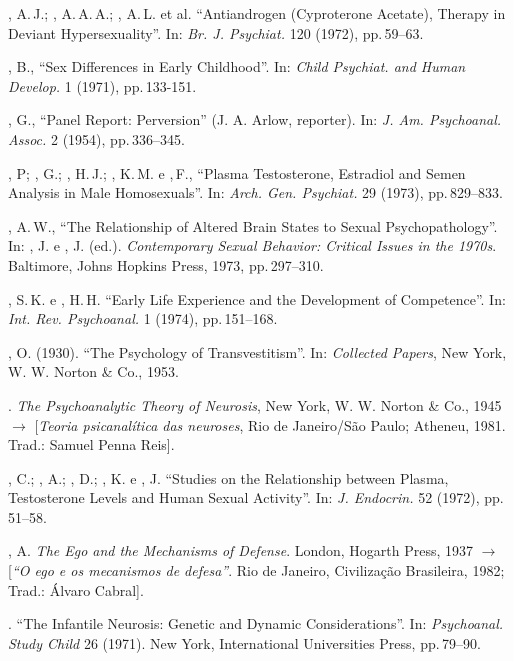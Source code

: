 \begin{description}
, A.\,J.; , A.\,A.\,A.; , A.\,L. et al.
``Antiandrogen (Cyproterone Acetate), Therapy in Deviant
Hypersexuality''. In: \textit{Br. J. Psychiat. }120 (1972), pp.\,59--63.

, B., ``Sex Differences in Early Childhood''. In: 
\textit{Child Psychiat. and Human Develop. }1 (1971), pp.\,133-151.

, G., ``Panel Report: Perversion'' (J. A.
Arlow, reporter). In: \textit{J. Am. Psychoanal. Assoc. } 2 (1954), pp.\,336--345.

, P; , G.; , H.\,J.; , K.\,M. e ,\,F.,
``Plasma Testosterone, Estradiol and Semen Analysis in Male
Homosexuals''. In: \textit{Arch. Gen. Psychiat. }29 (1973), pp.\,829--833.

, A.\,W., ``The Relationship of Altered Brain States to
Sexual Psychopathology''. In: , J. e , J. (ed.). 
\textit{Contemporary Sexual Behavior: Critical Issues in the 1970s}. Baltimore,
Johns Hopkins Press, 1973, pp.\,297--310.

, S.\,K. e , H.\,H. ``Early Life Experience and the
Development of Competence''. In: \textit{Int. Rev. Psychoanal. }1 (1974),
pp.\,151--168.

, O. (1930). ``The Psychology of
Transvestitism''. In: \textit{Collected Papers}, New York, W.
W. Norton \& Co., 1953.

. \textit{ The Psychoanalytic Theory of Neurosis}, New York, W.
W. Norton \& Co., 1945 {$\bm{\rightarrow}$} [\textit{Teoria psicanalítica das neuroses}, Rio de
Janeiro/São Paulo; Atheneu, 1981. Trad.: Samuel Penna Reis].

, C.; , A.; , D.; , K. e , J.
``Studies on the Relationship between Plasma, Testosterone Levels and
Human Sexual Activity''. In: \textit{J. Endocrin.} 52 (1972), pp.\,51--58.

, A. \textit{The Ego and the Mechanisms of Defense}. London, Hogarth
Press, 1937 {$\bm{\rightarrow}$} [\textit{``O ego e os mecanismos de
defesa''}. Rio de Janeiro, Civilização Brasileira, 1982; Trad.:
Álvaro Cabral].

. ``The Infantile Neurosis: Genetic and Dynamic
Considerations''. In: \textit{Psychoanal. Study Child }26 (1971). 
New York, International Universities Press, pp.\,79--90.


\end{description}
